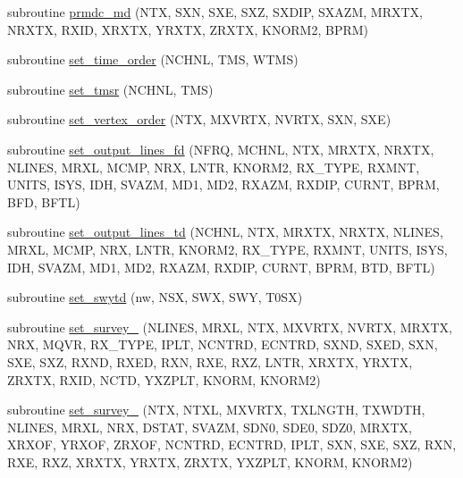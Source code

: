 \begin{DoxyCompactItemize}
\item 
subroutine \hyperlink{Leroi_8f90_a2212318f6dd3a1fda873532ddfb09348}{prmdc\+\_\+md} (N\+TX, S\+XN, S\+XE, S\+XZ, S\+X\+D\+IP, S\+X\+A\+ZM, M\+R\+X\+TX, N\+R\+X\+TX, R\+X\+ID, X\+R\+X\+TX, Y\+R\+X\+TX, Z\+R\+X\+TX, K\+N\+O\+R\+M2, B\+P\+RM)
\item 
subroutine \hyperlink{Leroi_8f90_ab7ca289c09589698d4ff1bd15e1a16e6}{set\+\_\+time\+\_\+order} (N\+C\+H\+NL, T\+MS, W\+T\+MS)
\item 
subroutine \hyperlink{Leroi_8f90_a404aa1badfba9369219343ec158c37ca}{set\+\_\+tmsr} (N\+C\+H\+NL, T\+MS)
\item 
subroutine \hyperlink{Leroi_8f90_a0cb3e794e8c12de92dbc3e157d7991c4}{set\+\_\+vertex\+\_\+order} (N\+TX, M\+X\+V\+R\+TX, N\+V\+R\+TX, S\+XN, S\+XE)
\item 
subroutine \hyperlink{Leroi_8f90_a25dab6f0be9119c8c046915473136d9c}{set\+\_\+output\+\_\+lines\+\_\+fd} (N\+F\+RQ, M\+C\+H\+NL, N\+TX, M\+R\+X\+TX, N\+R\+X\+TX, N\+L\+I\+N\+ES, M\+R\+XL, M\+C\+MP, N\+RX, L\+N\+TR, K\+N\+O\+R\+M2, R\+X\+\_\+\+T\+Y\+PE, R\+X\+M\+NT, U\+N\+I\+TS, I\+S\+YS, I\+DH, S\+V\+A\+ZM, M\+D1, M\+D2, R\+X\+A\+ZM, R\+X\+D\+IP, C\+U\+R\+NT, B\+P\+RM, B\+FD, B\+F\+TL)
\item 
subroutine \hyperlink{Leroi_8f90_a2a5820b2a223f63d10cd7fe63469c604}{set\+\_\+output\+\_\+lines\+\_\+td} (N\+C\+H\+NL, N\+TX, M\+R\+X\+TX, N\+R\+X\+TX, N\+L\+I\+N\+ES, M\+R\+XL, M\+C\+MP, N\+RX, L\+N\+TR, K\+N\+O\+R\+M2, R\+X\+\_\+\+T\+Y\+PE, R\+X\+M\+NT, U\+N\+I\+TS, I\+S\+YS, I\+DH, S\+V\+A\+ZM, M\+D1, M\+D2, R\+X\+A\+ZM, R\+X\+D\+IP, C\+U\+R\+NT, B\+P\+RM, B\+TD, B\+F\+TL)
\item 
subroutine \hyperlink{Leroi_8f90_a070fa81fa07083804479fa6b78707607}{set\+\_\+swytd} (nw, N\+SX, S\+WX, S\+WY, T0\+SX)
\item 
subroutine \hyperlink{Leroi_8f90_a27012846f79c1bc36d500442dad45d7c}{set\+\_\+survey\+\_} (N\+L\+I\+N\+ES, M\+R\+XL, N\+TX, M\+X\+V\+R\+TX, N\+V\+R\+TX, M\+R\+X\+TX, N\+RX, M\+Q\+VR, R\+X\+\_\+\+T\+Y\+PE, I\+P\+LT, N\+C\+N\+T\+RD, E\+C\+N\+T\+RD, S\+X\+ND, S\+X\+ED, S\+XN, S\+XE, S\+XZ, R\+X\+ND, R\+X\+ED, R\+XN, R\+XE, R\+XZ, L\+N\+TR, X\+R\+X\+TX, Y\+R\+X\+TX, Z\+R\+X\+TX, R\+X\+ID, N\+C\+TD, Y\+X\+Z\+P\+LT, K\+N\+O\+RM, K\+N\+O\+R\+M2)
\item 
subroutine \hyperlink{Leroi_8f90_a8b4a76899e2dcc9f323ef19f765d6679}{set\+\_\+survey\+\_} (N\+TX, N\+T\+XL, M\+X\+V\+R\+TX, T\+X\+L\+N\+G\+TH, T\+X\+W\+D\+TH, N\+L\+I\+N\+ES, M\+R\+XL, N\+RX, D\+S\+T\+AT, S\+V\+A\+ZM, S\+D\+N0, S\+D\+E0, S\+D\+Z0, M\+R\+X\+TX, X\+R\+X\+OF, Y\+R\+X\+OF, Z\+R\+X\+OF, N\+C\+N\+T\+RD, E\+C\+N\+T\+RD, I\+P\+LT, S\+XN, S\+XE, S\+XZ, R\+XN, R\+XE, R\+XZ, X\+R\+X\+TX, Y\+R\+X\+TX, Z\+R\+X\+TX, Y\+X\+Z\+P\+LT, K\+N\+O\+RM, K\+N\+O\+R\+M2)

\end{DoxyCompactItemize}
